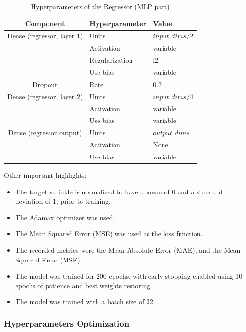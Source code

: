 \documentclass[sigconf,natbib=false]{acmart}
\begin{document}
\begin{table}
  \caption{Hyperparameters of the Regressor (MLP part)}
  \label{tab:hyperparams_regressor}
  \begin{tabular}{cll}
    \toprule
    Component & Hyperparameter & Value \\
    \midrule
    Dense (regressor, layer 1) & Units & $input\_dims/2$ \\
                               & Activation & variable \\
                               & Regularization & l2 \\
                               & Use bias & variable \\
    Dropout & Rate & 0.2 \\
    Dense (regressor, layer 2) & Units & $input\_dims/4$ \\
                               & Activation & variable \\
                               & Use bias & variable \\
    Dense (regressor output) & Units & $output\_dims$ \\
                             & Activation & None \\
                             & Use bias & variable \\
    \bottomrule
  \end{tabular}
\end{table}

Other important highlights:

\begin{itemize}
\item The target variable is normalized to have a mean of 0 and a standard deviation of 1, prior to training.
\item The Adamax optimizer was used.
\item The Mean Squared Error (MSE) was used as the loss function.
\item The recorded metrics were the Mean Absolute Error (MAE), and the Mean Squared Error (MSE).
\item The model was trained for 200 epochs, with early stopping enabled using 10 epochs of patience and best weights restoring.
\item The model was trained with a batch size of 32.
\end{itemize}

\subsubsection{Hyperparameters Optimization}
\end{document}
